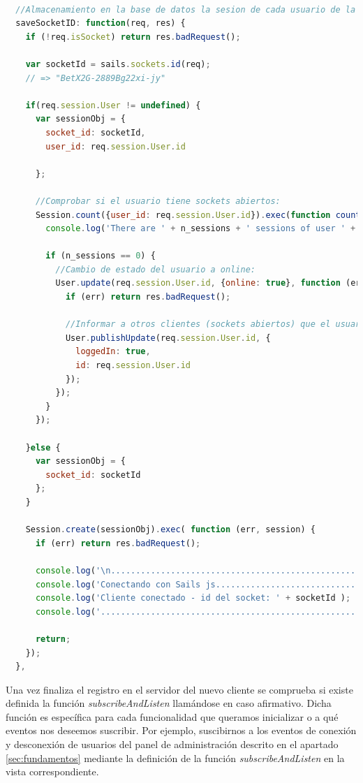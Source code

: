 \begin{lstlisting}[language=JavaScript]

  //Almacenamiento en la base de datos la sesion de cada usuario de la página:
  saveSocketID: function(req, res) {
    if (!req.isSocket) return res.badRequest();

    var socketId = sails.sockets.id(req);
    // => "BetX2G-2889Bg22xi-jy"

    if(req.session.User != undefined) {
      var sessionObj = {
        socket_id: socketId,
        user_id: req.session.User.id

      };

      //Comprobar si el usuario tiene sockets abiertos:
      Session.count({user_id: req.session.User.id}).exec(function countUserSessions(error, n_sessions) {
        console.log('There are ' + n_sessions + ' sessions of user ' + req.session.User.id);

        if (n_sessions == 0) {
          //Cambio de estado del usuario a online:
          User.update(req.session.User.id, {online: true}, function (err) {
            if (err) return res.badRequest();

            //Informar a otros clientes (sockets abiertos) que el usuario esta logueado:
            User.publishUpdate(req.session.User.id, {
              loggedIn: true,
              id: req.session.User.id
            });
          });
        }
      });

    }else {
      var sessionObj = {
        socket_id: socketId
      };
    }

    Session.create(sessionObj).exec( function (err, session) {
      if (err) return res.badRequest();

      console.log('\n..................................................');
      console.log('Conectando con Sails js.............................');
      console.log('Cliente conectado - id del socket: ' + socketId );
      console.log('....................................................');

      return;
    });
  },


\end{lstlisting}

Una vez finaliza el registro en el servidor del nuevo cliente se comprueba si existe definida la función \emph{subscribeAndListen} llamándose en caso afirmativo. Dicha función es específica para cada
funcionalidad que queramos inicializar o a qué eventos nos deseemos suscribir. Por ejemplo, suscibirnos a los eventos de conexión y desconexión de usuarios del panel de administración descrito en el apartado
\ref{sec:fundamentos} mediante la definición de la función \emph{subscribeAndListen} en la vista correspondiente.\\


